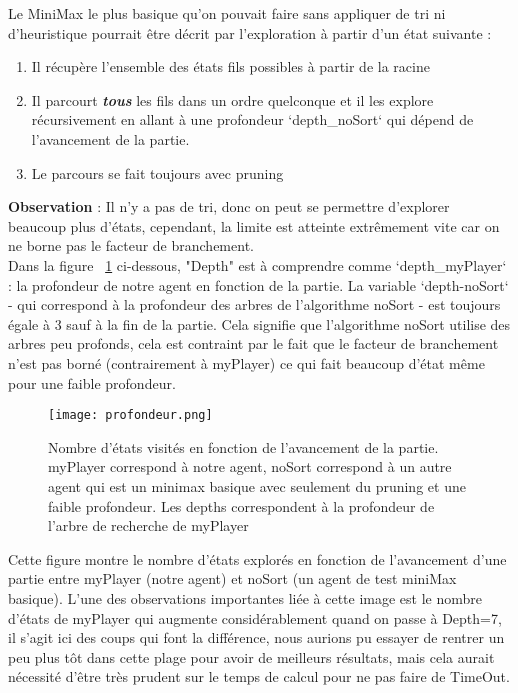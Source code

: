 \documentclass[a4paper,11pt,titlepage,leqno]{article}
\begin{document}
Le MiniMax le plus basique qu'on pouvait faire sans appliquer de tri ni d'heuristique pourrait être décrit par l'exploration à partir d'un état suivante :
\begin{enumerate}
    \item Il récupère l'ensemble des états fils possibles à partir de la racine
    \item Il parcourt \textbf{\textit{tous}} les fils dans un ordre quelconque et il les explore récursivement en allant à une profondeur `depth\_noSort` qui dépend de l'avancement de la partie.
    \item Le parcours se fait toujours avec pruning
\end{enumerate}
\textbf{Observation} : Il n'y a pas de tri, donc on peut se permettre d'explorer beaucoup plus d'états, cependant, la limite est atteinte extrêmement vite car on ne borne pas le facteur de branchement.\\

Dans la figure ~\ref{fig:profondeur} ci-dessous, "Depth" est à comprendre comme `depth\_myPlayer` : la profondeur de notre agent en fonction de la partie. La variable `depth-noSort` - qui correspond à la profondeur des arbres de l'algorithme noSort - est toujours égale à 3 sauf à la fin de la partie. Cela signifie que l'algorithme noSort utilise des arbres peu profonds, cela est contraint par le fait que le facteur de branchement n'est pas borné (contrairement à myPlayer) ce qui fait beaucoup d'état même pour une faible profondeur. 

\begin{figure}[h]
    \centering
    \texttt{[image: profondeur.png]}
    \caption{Nombre d'états visités en fonction de l'avancement de la partie. myPlayer correspond à notre agent, noSort correspond à un autre agent qui est un minimax basique avec seulement du pruning et une faible profondeur. Les depths correspondent à la profondeur de l'arbre de recherche de myPlayer}
    \label{fig:profondeur}
\end{figure}


Cette figure montre le nombre d'états explorés en fonction de l'avancement d'une partie entre myPlayer (notre agent) et noSort (un agent de test miniMax basique). L'une des observations importantes liée à cette image est le nombre d'états de myPlayer qui augmente considérablement quand on passe à Depth=7, il s'agit ici des coups qui font la différence, nous aurions pu essayer de rentrer un peu plus tôt dans cette plage pour avoir de meilleurs résultats, mais cela aurait nécessité d'être très prudent sur le temps de calcul pour ne pas faire de TimeOut.
\end{document}
